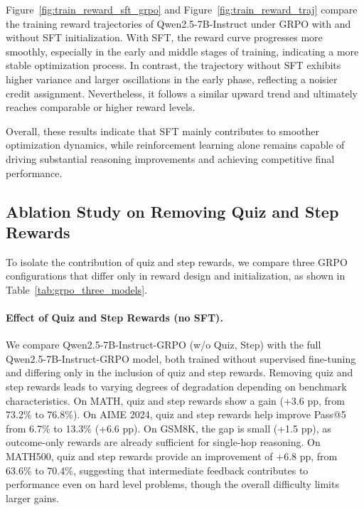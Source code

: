 \documentclass[12pt]{report}
\begin{document}
Figure~\ref{fig:train_reward_sft_grpo} and Figure~\ref{fig:train_reward_traj} compare the training reward trajectories of Qwen2.5-7B-Instruct under GRPO with and without SFT initialization. With SFT, the reward curve progresses more smoothly, especially in the early and middle stages of training, indicating a more stable optimization process. In contrast, the trajectory without SFT exhibits higher variance and larger oscillations in the early phase, reflecting a noisier credit assignment. Nevertheless, it follows a similar upward trend and ultimately reaches comparable or higher reward levels.

Overall, these results indicate that SFT mainly contributes to smoother optimization dynamics, while reinforcement learning alone remains capable of driving substantial reasoning improvements and achieving competitive final performance.

\subsection{Ablation Study on Removing Quiz and Step Rewards}
\label{sec:ablation_quiz_step}

To isolate the contribution of quiz and step rewards, we compare three GRPO configurations that differ only in reward design and initialization, as shown in Table~\ref{tab:grpo_three_models}.

\paragraph{Effect of Quiz and Step Rewards (no SFT).} We compare Qwen2.5-7B-Instruct-GRPO (w/o Quiz, Step) with the full Qwen2.5-7B-Instruct-GRPO model, both trained without supervised fine-tuning and differing only in the inclusion of quiz and step rewards. Removing quiz and step rewards leads to varying degrees of degradation depending on benchmark characteristics. On MATH, quiz and step rewards show a gain (+3.6 pp, from 73.2\% to 76.8\%). On AIME 2024, quiz and step rewards help improve Pass@5 from 6.7\% to 13.3\% (+6.6 pp). On GSM8K, the gap is small (+1.5 pp), as outcome-only rewards are already sufficient for single-hop reasoning. On MATH500, quiz and step rewards provide an improvement of +6.8 pp, from 63.6\% to 70.4\%, suggesting that intermediate feedback contributes to performance even on hard level problems, though the overall difficulty limits larger gains.
\end{document}
